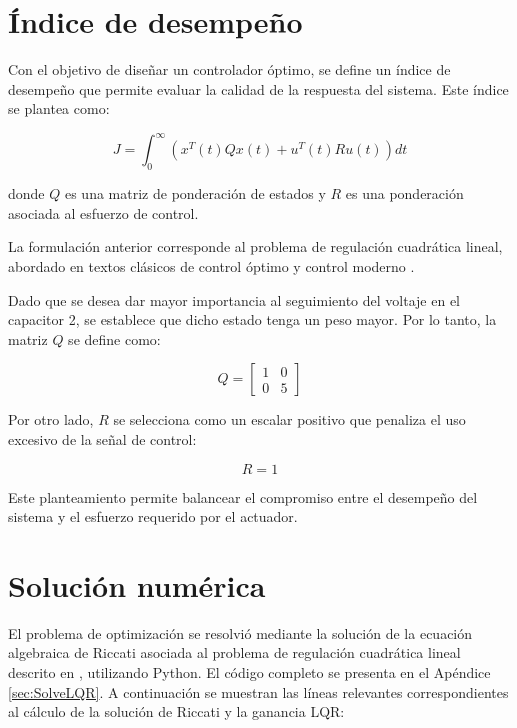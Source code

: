 \documentclass[12pt,letterpaper,twoside]{article}
\begin{document}
\section{Índice de desempeño}
\label{sec:performance}

Con el objetivo de diseñar un controlador óptimo, se define un índice de desempeño que permite evaluar la calidad de la respuesta del sistema. Este índice se plantea como:

\begin{equation}
J = \int_{0}^{\infty} \left( x^T(t) Q x(t) + u^T(t) R u(t) \right) dt
\end{equation}

donde \(Q\) es una matriz de ponderación de estados y \(R\) es una ponderación asociada al esfuerzo de control.

La formulación anterior corresponde al problema de regulación cuadrática lineal, abordado en textos clásicos de control óptimo y control moderno \cite{Ogata,Kirk}.

Dado que se desea dar mayor importancia al seguimiento del voltaje en el capacitor 2, se establece que dicho estado tenga un peso mayor. Por lo tanto, la matriz \(Q\) se define como:

\begin{equation}
Q =
\begin{bmatrix}
1 & 0 \\
0 & 5
\end{bmatrix}
\end{equation}

Por otro lado, \(R\) se selecciona como un escalar positivo que penaliza el uso excesivo de la señal de control:

\begin{equation}
R = 1
\end{equation}

Este planteamiento permite balancear el compromiso entre el desempeño del sistema y el esfuerzo requerido por el actuador.

\section{Solución numérica}

El problema de optimización se resolvió mediante la solución de la ecuación algebraica de Riccati asociada al problema de regulación cuadrática lineal descrito en \cite{Kirk}, utilizando Python. El código completo se presenta en el Apéndice \ref{sec:SolveLQR}. A continuación se muestran las líneas relevantes correspondientes al cálculo de la solución de Riccati y la ganancia LQR:
\end{document}
